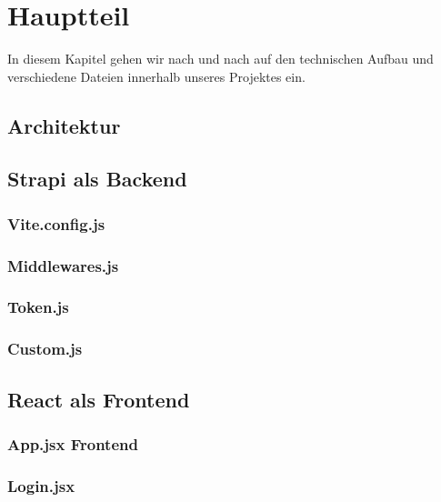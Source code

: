 \newpage

\section{Hauptteil} \label{hauptteil}
In diesem Kapitel gehen wir nach und nach auf den technischen Aufbau und verschiedene Dateien innerhalb unseres Projektes ein.
\subsection{Architektur} \label{architektur}


\subsection{Strapi als Backend} \label{strapiMain}

\subsubsection{Vite.config.js} \label{viteconfigjs}

\subsubsection{Middlewares.js} \label{middlewares}

\subsubsection{Token.js} \label{token}

\subsubsection{Custom.js} \label{custom}


\subsection{React als Frontend} \label{reactFrontend}

\subsubsection{App.jsx Frontend} \label{appfrontend}

\subsubsection{Login.jsx} \label{login}

